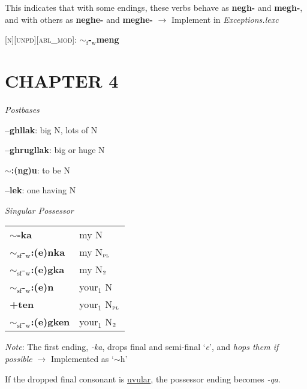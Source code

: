 \documentclass{article}
\begin{document}
This indicates that with some endings, these verbs behave as \textbf{negh-} and \textbf{megh-}, and with others as \textbf{neghe-} and \textbf{meghe-} $\rightarrow$ Implement in \textit{Exceptions.lexc}

\bigskip

\textsc{[n][unpd][abl\_mod]}: \textbf{$\sim_\text{f}$-$_\text{w}$meng}

\section*{CHAPTER 4}

\textit{Postbases}
\begin{description}
\item \textbf{--ghllak}: big N, lots of N
\item \textbf{--ghrugllak}: big or huge N
\item \textbf{$\sim$:(ng)u}: to be N
\item \textbf{--lek}: one having N
\end{description}

\bigskip

\textit{Singular Possessor} \\
\begin{tabular}{ l l }
\textbf{$\sim$-ka} & my N \\
\textbf{${\sim}_\text{sf}\text{-}_\text{w}$:(e)nka} & my N$_\text{\textsc{pl}}$ \\
\textbf{${\sim}_\text{sf}\text{-}_\text{w}$:(e)gka} & my N$_\text{\textsc{2}}$ \\
\textbf{${\sim}_\text{sf}\text{-}_\text{w}$:(e)n} & your$_1$ N \\
\textbf{+ten} & your$_1$ N$_\text{\textsc{pl}}$ \\
\textbf{${\sim}_\text{sf}\text{-}_\text{w}$:(e)gken} & your$_1$ N$_\text{\textsc{2}}$ \\
\end{tabular}

\bigskip

\textit{Note}: The first ending, \textit{-ka}, drops final and semi-final `\textit{e}', and \textit{hops them if possible} $\rightarrow$ Implemented as `$\sim$h'

If the dropped final consonant is \underline{uvular}, the possessor ending becomes \textit{-qa}.
\end{document}
